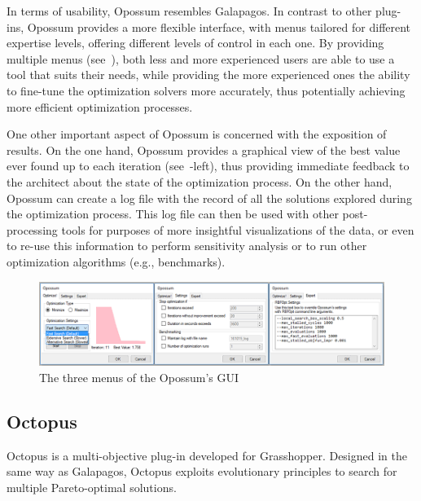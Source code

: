 In terms of usability, Opossum resembles Galapagos. In contrast to other plug-ins, Opossum provides a more flexible interface, with menus tailored for different expertise levels, offering different levels of control in each one. By providing multiple menus (see~), both less and more experienced users are able to use a tool that suits their needs, while providing the more experienced ones the ability to fine-tune the optimization solvers more accurately, thus potentially achieving more efficient optimization processes.

One other important aspect of Opossum is concerned with the exposition of results. On the one hand, Opossum provides a graphical view of the best value ever found up to each iteration (see~-left), thus providing immediate feedback to the architect about the state of the optimization process. On the other hand, Opossum can create a log file with the record of all the solutions explored during the optimization process. This log file can then be used with other post-processing tools for purposes of more insightful visualizations of the data, or even to re-use this information to perform sensitivity analysis or to run other optimization algorithms (e.g., benchmarks).

\begin{figure}
	\centering
	\includegraphics[width=1\textwidth]{Images/Background/Opossum/opossum_1.png}
	\caption[Opossum optimization plug-in menus]{The three menus of the Opossum's \ac{GUI}}
	\label{fig:opossum}
\end{figure}

\subsection{Octopus}

Octopus is a multi-objective plug-in developed for Grasshopper. Designed in the same way as Galapagos, Octopus exploits evolutionary principles to search for multiple Pareto-optimal solutions.  

